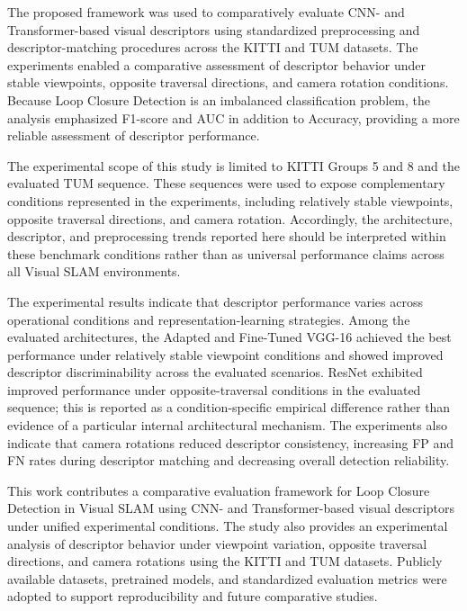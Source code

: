 \documentclass{ieeeaccess}
\newenvironment{revisionblock}
{%
  \par
  \begingroup
  \setlength{\fboxsep}{1pt}%
  \setlength{\OuterFrameSep}{0pt}%
  \def\FrameCommand##1{%
    \colorbox{white}{\color{revisionred}##1}%
  }%
  \MakeFramed{%
    \advance\hsize-2\fboxsep
    \FrameRestore
  }%
}
{%
  \endMakeFramed
  \endgroup
  \par
}
\renewenvironment{revisionblock}
  {\par\begingroup\color{revisionred}}
  {\par\endgroup}
\begin{document}
The proposed framework was used to comparatively evaluate CNN- and Transformer-based visual descriptors using standardized preprocessing and descriptor-matching procedures across the KITTI and TUM datasets. The experiments enabled a comparative assessment of descriptor behavior under stable viewpoints, opposite traversal directions, and camera rotation conditions. Because Loop Closure Detection is an imbalanced classification problem, the analysis emphasized F1-score and AUC in addition to Accuracy, providing a more reliable assessment of descriptor performance. 

\begin{revisionblock}
The experimental scope of this study is limited to KITTI Groups 5 and 8 and the evaluated TUM sequence. These sequences were used to expose complementary conditions represented in the experiments, including relatively stable viewpoints, opposite traversal directions, and camera rotation. Accordingly, the architecture, descriptor, and preprocessing trends reported here should be interpreted within these benchmark conditions rather than as universal performance claims across all Visual SLAM environments.
\end{revisionblock}
\begin{revisionblock}
The experimental results indicate that descriptor performance varies across operational conditions and representation-learning strategies. Among the evaluated architectures, the Adapted and Fine-Tuned VGG-16 achieved the best performance under relatively stable viewpoint conditions and showed improved descriptor discriminability across the evaluated scenarios. ResNet exhibited improved performance under opposite-traversal conditions in the evaluated sequence; this is reported as a condition-specific empirical difference rather than evidence of a particular internal architectural mechanism. The experiments also indicate that camera rotations reduced descriptor consistency, increasing FP and FN rates during descriptor matching and decreasing overall detection reliability.
\end{revisionblock}

This work contributes a comparative evaluation framework for Loop Closure Detection in Visual SLAM using CNN- and Transformer-based visual descriptors under unified experimental conditions. The study also provides an experimental analysis of descriptor behavior under viewpoint variation, opposite traversal directions, and camera rotations using the KITTI and TUM datasets. Publicly available datasets, pretrained models, and standardized evaluation metrics were adopted to support reproducibility and future comparative studies.
\end{document}
